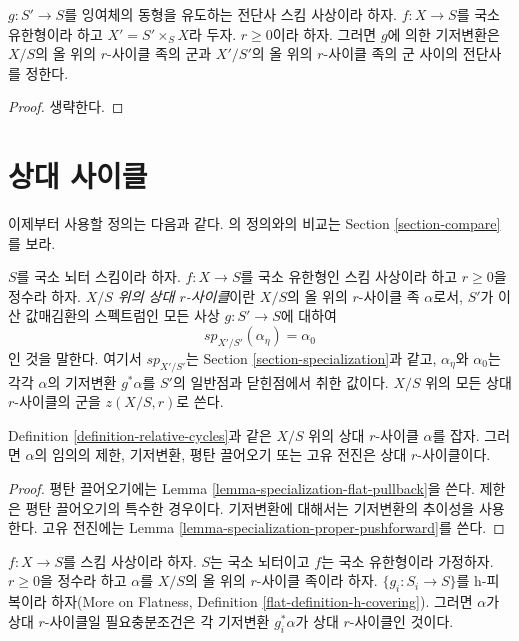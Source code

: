 \begin{lemma}
\label{lemma-pullback-universally-bijective}
$g : S' \to S$를 잉여체의 동형을 유도하는 전단사 스킴 사상이라 하자.
$f : X \to S$를 국소 유한형이라 하고 $X' = S' \times_S X$라 두자.
$r \geq 0$이라 하자. 그러면 $g$에 의한 기저변환은 $X/S$의 올
위의 $r$-사이클 족의 군과 $X'/S'$의 올 위의 $r$-사이클 족의 군
사이의 전단사를 정한다.
\end{lemma}

\begin{proof}
생략한다.
\end{proof}



\section{상대 사이클}
\label{section-families-specialization}

\noindent
이제부터 사용할 정의는 다음과 같다. \cite{SV}의 정의와의 비교는
Section \ref{section-compare}를 보라.

\begin{definition}
\label{definition-relative-cycles}
$S$를 국소 뇌터 스킴이라 하자. $f : X \to S$를 국소 유한형인
스킴 사상이라 하고 $r \geq 0$을 정수라 하자. {\it $X/S$ 위의 상대
$r$-사이클}이란 $X/S$의 올 위의 $r$-사이클 족 $\alpha$로서,
$S'$가 이산 값매김환의 스펙트럼인 모든 사상 $g : S' \to S$에 대하여
$$
sp_{X'/S'}(\alpha_\eta) = \alpha_0
$$
인 것을 말한다. 여기서 $sp_{X'/S'}$는 Section
\ref{section-specialization}과 같고, $\alpha_\eta$와 $\alpha_0$는 각각
$\alpha$의 기저변환 $g^*\alpha$를 $S'$의 일반점과 닫힌점에서 취한
값이다. $X/S$ 위의 모든 상대 $r$-사이클의 군을 $z(X/S, r)$로 쓴다.
\end{definition}

\begin{lemma}
\label{lemma-relative-cycle-functoriality}
Definition \ref{definition-relative-cycles}과 같은 $X/S$ 위의 상대
$r$-사이클 $\alpha$를 잡자. 그러면 $\alpha$의 임의의 제한,
기저변환, 평탄 끌어오기 또는 고유 전진은 상대 $r$-사이클이다.
\end{lemma}

\begin{proof}
평탄 끌어오기에는 Lemma \ref{lemma-specialization-flat-pullback}을 쓴다.
제한은 평탄 끌어오기의 특수한 경우이다. 기저변환에 대해서는
기저변환의 추이성을 사용한다. 고유 전진에는
Lemma \ref{lemma-specialization-proper-pushforward}를 쓴다.
\end{proof}

\begin{lemma}
\label{lemma-relative-cycles-h-descent}
$f : X \to S$를 스킴 사상이라 하자. $S$는 국소 뇌터이고 $f$는
국소 유한형이라 가정하자. $r \geq 0$을 정수라 하고 $\alpha$를
$X/S$의 올 위의 $r$-사이클 족이라 하자. $\{g_i : S_i \to S\}$를
h-피복이라 하자(More on Flatness, Definition
\ref{flat-definition-h-covering}). 그러면 $\alpha$가 상대 $r$-사이클일
필요충분조건은 각 기저변환 $g_i^*\alpha$가 상대 $r$-사이클인 것이다.
\end{lemma}

